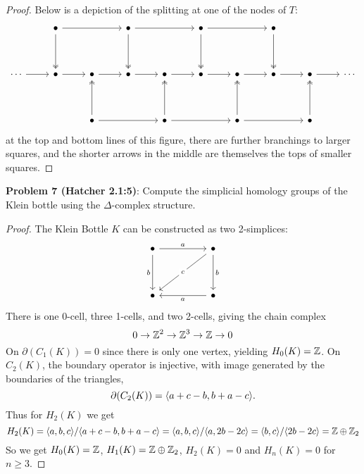\documentclass{amsart}
\begin{document}
\begin{proof}
	Below is a depiction of the splitting at one of the nodes of $T$:
	$$
	\begin{tikzcd}
		& \bullet && \bullet && \bullet && \bullet \\
		\\
		\cdots & \bullet & \bullet & \bullet & \bullet & \bullet & \bullet & \bullet & \bullet & \cdots \\
		\\
		&& \bullet && \bullet && \bullet && \bullet
		\arrow[from=1-2, to=1-4]
		\arrow[two heads, from=1-2, to=3-2]
		\arrow[from=1-4, to=1-6]
		\arrow[two heads, from=1-4, to=3-4]
		\arrow[from=1-6, to=1-8]
		\arrow[two heads, from=1-6, to=3-6]
		\arrow[two heads, from=1-8, to=3-8]
		\arrow[from=3-1, to=3-2]
		\arrow[from=3-2, to=3-3]
		\arrow[from=3-3, to=3-4]
		\arrow[from=3-4, to=3-5]
		\arrow[from=3-5, to=3-6]
		\arrow[from=3-6, to=3-7]
		\arrow[from=3-7, to=3-8]
		\arrow[from=3-8, to=3-9]
		\arrow[from=3-9, to=3-10]
		\arrow[two heads, from=5-3, to=3-3]
		\arrow[from=5-3, to=5-5]
		\arrow[two heads, from=5-5, to=3-5]
		\arrow[from=5-5, to=5-7]
		\arrow[two heads, from=5-7, to=3-7]
		\arrow[from=5-7, to=5-9]
		\arrow[two heads, from=5-9, to=3-9]
	\end{tikzcd}
	$$
	at the top and bottom lines of this figure, there are further branchings to larger squares, and the shorter arrows in the middle are themselves the tops of smaller squares.
\end{proof}

\newpage
\textbf{Problem 7 (Hatcher 2.1:5)}: Compute the simplicial homology groups of the Klein bottle using the $\Delta$-complex structure.
\begin{proof}
	The Klein Bottle $K$ can be constructed as two 2-simplices:
	$$
	\begin{tikzcd}
		\bullet && \bullet \\
		\\
		\bullet && \bullet
		\arrow["a", from=1-1, to=1-3]
		\arrow["b"', from=1-1, to=3-1]
		\arrow["c"{description}, from=1-3, to=3-1]
		\arrow["b", from=1-3, to=3-3]
		\arrow["a", from=3-3, to=3-1]
	\end{tikzcd}
	$$
	There is one 0-cell, three 1-cells, and two 2-cells, giving the chain complex
	$$
	0 \to \mathbb{Z}^2 \to \mathbb{Z}^3 \to \mathbb{Z} \to 0
	$$
	On $\partial(C_1(K))=0$ since there is only one vertex, yielding $H_0(K)=\mathbb{Z}$. On $C_2(K)$, the boundary operator is injective, with image generated by the boundaries of the triangles,
	$$
	\partial(C_2(K)) = \langle a+c - b, b + a - c\rangle.
	$$
	Thus for $H_2(K)$ we get
	$$
	H_2(K) = \langle a,b,c\rangle/\langle a+c-b,b+a-c\rangle = \langle a,b,c\rangle/\langle a,2b-2c\rangle = \langle b,c\rangle/\langle2b-2c\rangle = \mathbb{Z}\oplus \mathbb{Z}_2
	$$
	So we get $H_0(K)=\mathbb{Z}$, $H_1(K)=\mathbb{Z}\oplus \mathbb{Z}_2$, $H_2(K)=0$ and $H_n(K)=0$ for $n\geq 3$.
\end{proof}
\end{document}
